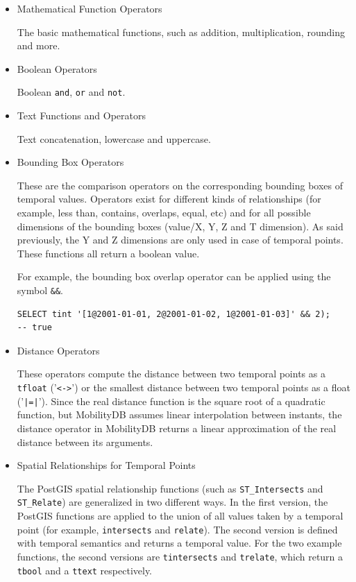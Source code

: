 \begin{itemize}
    \item Mathematical Function Operators

        The basic mathematical functions, such as addition, multiplication, rounding and more.

    \item Boolean Operators

        Boolean \lstinline{and}, \lstinline{or} and \lstinline{not}.

    \item Text Functions and Operators

        Text concatenation, lowercase and uppercase.

    \item Bounding Box Operators

        These are the comparison operators on the corresponding bounding boxes of temporal values. Operators exist for different kinds of relationships (for example, less than, contains, overlaps, equal, etc) and for all possible dimensions of the bounding boxes (value/X, Y, Z and T dimension). As said previously, the Y and Z dimensions are only used in case of temporal points. These functions all return a boolean value.

        For example, the bounding box overlap operator can be applied using the symbol \lstinline{&&}.
        \begin{lstlisting}
SELECT tint '[1@2001-01-01, 2@2001-01-02, 1@2001-01-03]' && 2);
-- true
        \end{lstlisting}

    \item Distance Operators

        These operators compute the distance between two temporal points as a \lstinline{tfloat} ('\lstinline+<->+') or the smallest distance between two temporal points as a float ('\lstinline+|=|+'). Since the real distance function is the square root of a quadratic function, but MobilityDB assumes linear interpolation between instants, the distance operator in MobilityDB returns a linear approximation of the real distance between its arguments.

    \item Spatial Relationships for Temporal Points

        The PostGIS spatial relationship functions (such as \lstinline{ST_Intersects} and \lstinline{ST_Relate}) are generalized in two different ways. In the first version, the PostGIS functions are applied to the union of all values taken by a temporal point (for example, \lstinline{intersects} and \lstinline{relate}). The second version is defined with temporal semantics and returns a temporal value. For the two example functions, the second versions are \lstinline{tintersects} and \lstinline{trelate}, which return a \lstinline{tbool} and a \lstinline{ttext} respectively.


\end{itemize}
